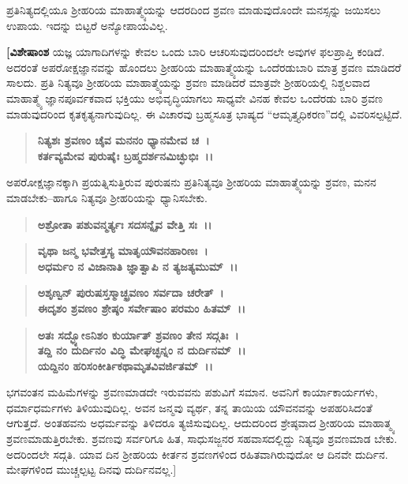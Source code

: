 ಪ್ರತಿನಿತ್ಯದಲ್ಲಿಯೂ ಶ‍್ರೀಹರಿಯ ಮಾಹಾತ್ಮ್ಯೆಯನ್ನು ಆದರದಿಂದ ಶ್ರವಣ ಮಾಡುವುದೊಂದೇ ಮನಸ್ಸನ್ನು ಜಯಿಸಲು ಉಪಾಯ. ಇದನ್ನು ಬಿಟ್ಟರೆ ಅನ್ಯೋಪಾಯವಿಲ್ಲ.

\textbf{[ವಿಶೇಷಾಂಶ} ಯಜ್ಞ ಯಾಗಾದಿಗಳನ್ನು ಕೇವಲ ಒಂದು ಬಾರಿ ಆಚರಿಸುವುದರಿಂದಲೇ ಅವುಗಳ ಫಲಪ್ರಾಪ್ತಿ ಕಂಡಿದೆ. ಅದರಂತೆ ಅಪರೋಕ್ಷಜ್ಞಾನವನ್ನು ಹೊಂದಲು ಶ‍್ರೀಹರಿಯ ಮಾಹಾತ್ಮ್ಯೆಯನ್ನು ಒಂದೆರಡುಬಾರಿ ಮಾತ್ರ ಶ್ರವಣ ಮಾಡಿದರೆ ಸಾಲದು. ಪ್ರತಿ ನಿತ್ಯವೂ ಶ‍್ರೀಹರಿಯ ಮಾಹಾತ್ಮ್ಯೆಯನ್ನು ಶ್ರವಣ ಮಾಡಿದರೆ ಮಾತ್ರವೇ ಶ‍್ರೀಹರಿಯಲ್ಲಿ ನಿಶ್ಚಲವಾದ ಮಾಹಾತ್ಮ್ಯೆ ಜ್ಞಾನಪೂರ್ವಕವಾದ ಭಕ್ತಿಯು ಅಭಿವೃದ್ಧಿಯಾಗಲು ಸಾಧ್ಯವೇ ವಿನಹ ಕೇವಲ ಒಂದೆರಡು ಬಾರಿ ಶ್ರವಣ ಮಾಡುವುದರಿಂದ ಕೃತಕೃತ್ಯನಾಗುವುದಿಲ್ಲ. ಈ ವಿಚಾರವು ಬ್ರಹ್ಮಸೂತ್ರ ಭಾಷ್ಯದ “ಆಮೃತ್ತ್ಯಧಿಕರಣ”ದಲ್ಲಿ ವಿವರಿಸಲ್ಪಟ್ಟಿದೆ.

\begin{verse}
\textbf{ನಿತ್ಯಶಃ ಶ್ರವಣಂ ಚೈವ ಮನನಂ ಧ್ಯಾನಮೇವ ಚ~।}\\\textbf{ಕರ್ತವ್ಯಮೇವ ಪುರುಷೈಃ ಬ್ರಹ್ಮದರ್ಶನಮಿಚ್ಛುಭಿಃ~।।} 
\end{verse}

ಅಪರೋಕ್ಷಜ್ಞಾನಕ್ಕಾಗಿ ಪ್ರಯತ್ನಿಸುತ್ತಿರುವ ಪುರುಷನು ಪ್ರತಿನಿತ್ಯವೂ ಶ‍್ರೀಹರಿಯ ಮಾಹಾತ್ಮ್ಯೆಯನ್ನು ಶ್ರವಣ, ಮನನ ಮಾಡಬೇಕು–ಹಾಗೂ ನಿತ್ಯವೂ ಶ‍್ರೀಹರಿಯನ್ನು ಧ್ಯಾನಿಸಬೇಕು.

\begin{verse}
\textbf{ಅಶ್ರೋತಾ ಪಶುವನ್ಮರ್ತ್ಯಃ ಸದಸನ್ನೈವ ವೇತ್ತಿ ಸಃ~।।} 
\end{verse}

\begin{verse}
\textbf{ವೃಥಾ ಜನ್ಮ ಭವೇತ್ತಸ್ಯ ಮಾತೃಯೌವನಹಾರಿಣಃ~।}\\\textbf{ಅಧರ್ಮಂ ನ ವಿಜಾನಾತಿ ಜ್ಞಾತ್ವಾಪಿ ನ ತ್ಯಜತ್ಯಮುಮ್~।। }
\end{verse}

\begin{verse}
\textbf{ಅಶೃಣ್ವನ್ ಪುರುಷಸ್ತಸ್ಮಾಚ್ಛ್ರವಣಂ ಸರ್ವದಾ ಚರೇತ್~।}\\\textbf{ಈದೃಶಂ ಶ್ರವಣಂ ಶ್ರೇಷ್ಠಂ ಸರ್ವೇಷಾಂ ಪರಮಂ ಹಿತಮ್~।। }
\end{verse}

\begin{verse}
\textbf{ಅತಃ ಸದ್ಭ್ಯೋಽನಿಶಂ ಕುರ್ಯಾತ್ ಶ್ರವಣಂ ತೇನ ಸದ್ಗತಿಃ~।}\\\textbf{ತದ್ದಿ ನಂ ದುರ್ದಿನಂ ವಿದ್ಧಿ ಮೇಘಚ್ಛನ್ನಂ ನ ದುರ್ದಿನಮ್~।। }\\\textbf{ಯದ್ದಿನಂ ಹರಿಸಂಕೀರ್ತಿಕಥಾಮೃತವಿವರ್ಜಿತಮ್~।।} 
\end{verse}

ಭಗವಂತನ ಮಹಿಮೆಗಳನ್ನು ಶ್ರವಣಮಾಡದೇ ಇರುವವನು ಪಶುವಿಗೆ ಸಮಾನ. ಅವನಿಗೆ ಕಾರ್ಯಾಕಾರ್ಯಗಳು, ಧರ್ಮಾಧರ್ಮಗಳು ತಿಳಿಯುವುದಿಲ್ಲ. ಅವನ ಜನ್ಮವು ವ್ಯರ್ಥ, ತನ್ನ ತಾಯಿಯ ಯೌವನವನ್ನು ಅಪಹರಿಸಿದಂತೆ ಆಗುತ್ತದೆ. ಅಂತಹವನು ಅಧರ್ಮವನ್ನು ತಿಳಿದರೂ ತ್ಯಜಿಸುವುದಿಲ್ಲ. ಆದುದರಿಂದ ಶ್ರೇಷ್ಠವಾದ ಶ‍್ರೀಹರಿಯ ಮಾಹಾತ್ಮ್ಯ ಶ್ರವಣಮಾಡುತ್ತಿರಬೇಕು. ಶ್ರವಣವು ಸರ್ವರಿಗೂ ಹಿತ, ಸಾಧುಸಜ್ಜನರ ಸಹವಾಸದಲ್ಲಿದ್ದು ನಿತ್ಯವೂ ಶ್ರವಣಮಾಡ ಬೇಕು. ಅದರಿಂದಲೇ ಸದ್ಗತಿ. ಯಾವ ದಿನ ಶ‍್ರೀಹರಿಯ ಕೀರ್ತನ ಶ್ರವಣಗಳಿಂದ ರಹಿತವಾಗಿರುವುದೋ ಆ ದಿನವೇ ದುರ್ದಿನ. ಮೇಘಗಳಿಂದ ಮುಚ್ಚಲ್ಪಟ್ಟ ದಿನವು ದುರ್ದಿನವಲ್ಲ.]

